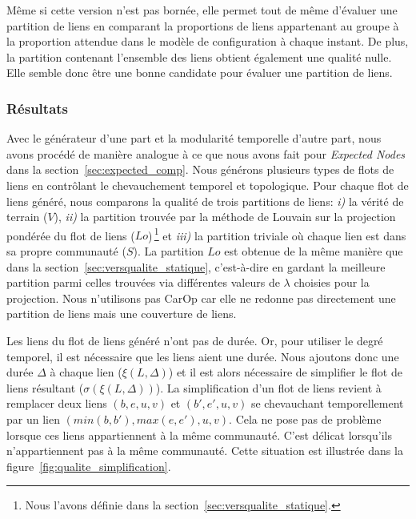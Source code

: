  

Même si cette version n'est pas bornée, elle permet tout de même d'évaluer une partition de liens en comparant la proportions de liens appartenant au groupe à la proportion attendue dans le modèle de configuration à chaque instant.
De plus, la partition contenant l'ensemble des liens obtient également une qualité nulle.
Elle semble donc être une bonne candidate pour évaluer une partition de liens.

\subsubsection{Résultats}

Avec le générateur d'une part et la modularité temporelle d'autre part, nous avons procédé de manière analogue à ce que nous avons fait pour \emph{Expected Nodes} dans la section~\ref{sec:expected_comp}.
Nous générons plusieurs types de flots de liens en contrôlant le chevauchement temporel et topologique.
Pour chaque flot de liens généré, nous comparons la qualité de trois partitions de liens: \emph{i)} la vérité de terrain ($V$), \emph{ii)} la partition trouvée par la méthode de Louvain sur la projection pondérée du flot de liens ($Lo$)\,\footnote{Nous l'avons définie dans la section~\ref{sec:versqualite_statique}.} et \emph{iii)} la partition triviale où chaque lien est dans sa propre communauté ($S$).
La partition $Lo$ est obtenue de la même manière que dans la section~\ref{sec:versqualite_statique}, c'est-à-dire en gardant la meilleure partition parmi celles trouvées via différentes valeurs de $\lambda$ choisies pour la projection.
Nous n'utilisons pas CarOp car elle ne redonne pas directement une partition de liens mais une couverture de liens.

Les liens du flot de liens généré n'ont pas de durée.
Or, pour utiliser le degré temporel, il est nécessaire que les liens aient une durée.
Nous ajoutons donc une durée $\Delta$ à chaque lien ($\xi(L,\Delta)$) et il est alors nécessaire de simplifier le flot de liens résultant ($\sigma(\xi(L,\Delta))$).
La simplification d'un flot de liens revient à remplacer deux liens $(b,e,u,v)$ et $(b',e',u,v)$ se chevauchant temporellement par un lien $(min(b,b'),max(e,e'),u,v)$.
Cela ne pose pas de problème lorsque ces liens appartiennent à la même communauté.
C'est délicat lorsqu'ils n'appartiennent pas à la même communauté.
Cette situation est illustrée dans la figure~\ref{fig:qualite_simplification}.

